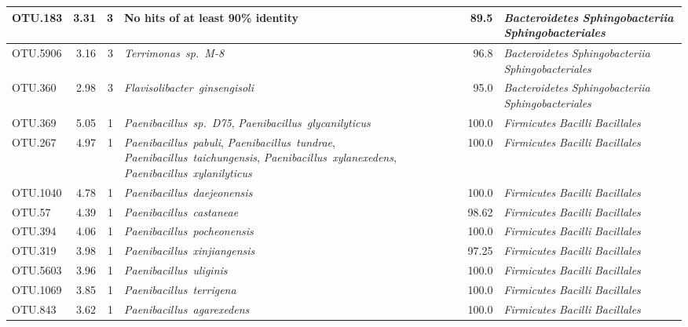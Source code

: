 \begin{longtable}{lrrP{5cm}rP{5cm}}
OTU.183 & 3.31 & 3 & {No hits of at least 90\% identity} & 89.5 & \mbox{\textit{Bacteroidetes}} \mbox{\textit{Sphingobacteriia}} \mbox{\textit{Sphingobacteriales}} \\ \midrule
OTU.5906 & 3.16 & 3 & \mbox{\textit{Terrimonas sp. M-8}} & 96.8 & \mbox{\textit{Bacteroidetes}} \mbox{\textit{Sphingobacteriia}} \mbox{\textit{Sphingobacteriales}} \\ \midrule
OTU.360 & 2.98 & 3 & \mbox{\textit{Flavisolibacter ginsengisoli}} & 95.0 & \mbox{\textit{Bacteroidetes}} \mbox{\textit{Sphingobacteriia}} \mbox{\textit{Sphingobacteriales}} \\ \midrule
OTU.369 & 5.05 & 1 & \mbox{\textit{Paenibacillus sp. D75}}, \mbox{\textit{Paenibacillus glycanilyticus}} & 100.0 & \mbox{\textit{Firmicutes}} \mbox{\textit{Bacilli}} \mbox{\textit{Bacillales}} \\ \midrule
OTU.267 & 4.97 & 1 & \mbox{\textit{Paenibacillus pabuli}}, \mbox{\textit{Paenibacillus tundrae}}, \mbox{\textit{Paenibacillus taichungensis}}, \mbox{\textit{Paenibacillus xylanexedens}}, \mbox{\textit{Paenibacillus xylanilyticus}} & 100.0 & \mbox{\textit{Firmicutes}} \mbox{\textit{Bacilli}} \mbox{\textit{Bacillales}} \\ \midrule
OTU.1040 & 4.78 & 1 & \mbox{\textit{Paenibacillus daejeonensis}} & 100.0 & \mbox{\textit{Firmicutes}} \mbox{\textit{Bacilli}} \mbox{\textit{Bacillales}} \\ \midrule
OTU.57 & 4.39 & 1 & \mbox{\textit{Paenibacillus castaneae}} & 98.62 & \mbox{\textit{Firmicutes}} \mbox{\textit{Bacilli}} \mbox{\textit{Bacillales}} \\ \midrule
OTU.394 & 4.06 & 1 & \mbox{\textit{Paenibacillus pocheonensis}} & 100.0 & \mbox{\textit{Firmicutes}} \mbox{\textit{Bacilli}} \mbox{\textit{Bacillales}} \\ \midrule
OTU.319 & 3.98 & 1 & \mbox{\textit{Paenibacillus xinjiangensis}} & 97.25 & \mbox{\textit{Firmicutes}} \mbox{\textit{Bacilli}} \mbox{\textit{Bacillales}} \\ \midrule
OTU.5603 & 3.96 & 1 & \mbox{\textit{Paenibacillus uliginis}} & 100.0 & \mbox{\textit{Firmicutes}} \mbox{\textit{Bacilli}} \mbox{\textit{Bacillales}} \\ \midrule
OTU.1069 & 3.85 & 1 & \mbox{\textit{Paenibacillus terrigena}} & 100.0 & \mbox{\textit{Firmicutes}} \mbox{\textit{Bacilli}} \mbox{\textit{Bacillales}} \\ \midrule
OTU.843 & 3.62 & 1 & \mbox{\textit{Paenibacillus agarexedens}} & 100.0 & \mbox{\textit{Firmicutes}} \mbox{\textit{Bacilli}} \mbox{\textit{Bacillales}} \\ \midrule

\end{longtable}
